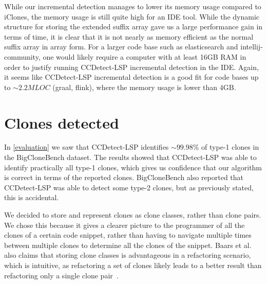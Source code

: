 While our incremental detection manages to lower its memory usage compared to iClones, the
memory usage is still quite high for an IDE tool. While the dynamic structure for storing
the extended suffix array gave us a large performance gain in terms of time, it is clear
that it is not nearly as memory efficient as the normal suffix array in array form. For a
larger code base such as elasticsearch and intellij-community, one would likely require a
computer with at least 16GB RAM in order to justify running CCDetect-LSP incremental
detection in the IDE. Again, it seems like CCDetect-LSP incremental detection is a good
fit for code bases up to ${\sim}2.2MLOC$ (graal, flink), where the memory usage is lower
than 4GB.

\section{Clones detected}

In \cref{evaluation} we saw that CCDetect-LSP identifies ${\sim}99.98\%$ of type-1 clones in
the BigCloneBench dataset. The results showed that CCDetect-LSP was able to identify
practically all type-1 clones, which gives us confidence that our algorithm is correct in
terms of the reported clones. BigCloneBench also reported that CCDetect-LSP was able to
detect some type-2 clones, but as previously stated, this is accidental.

We decided to store and represent clones as clone classes, rather than clone pairs. We
chose this because it gives a clearer picture to the programmer of all the clones of a
certain code snippet, rather than having to navigate multiple times between multiple
clones to determine all the clones of the snippet. Baars et al. also claims that storing
clone classes is advantageous in a refactoring scenario, which is intuitive, as
refactoring a set of clones likely leads to a better result than refactoring only a single
clone pair~\cite{TowardsAutomatedRefactoring}.


